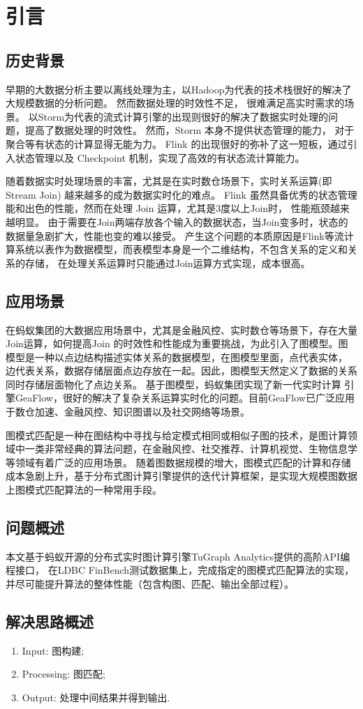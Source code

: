 \section{引言}

\subsection{历史背景}
早期的大数据分析主要以离线处理为主，以Hadoop为代表的技术栈很好的解决了大规模数据的分析问题。
然而数据处理的时效性不足， 很难满足高实时需求的场景。
以Storm为代表的流式计算引擎的出现则很好的解决了数据实时处理的问题，提高了数据处理的时效性。
然而，Storm 本身不提供状态管理的能力， 对于聚合等有状态的计算显得无能为力。
Flink 的出现很好的弥补了这一短板，通过引入状态管理以及 Checkpoint 机制，实现了高效的有状态流计算能力。

随着数据实时处理场景的丰富，尤其是在实时数仓场景下，实时关系运算(即 Stream Join) 越来越多的成为数据实时化的难点。
Flink 虽然具备优秀的状态管理能和出色的性能，然而在处理 Join 运算，尤其是3度以上Join时， 性能瓶颈越来越明显。
由于需要在Join两端存放各个输入的数据状态，当Join变多时，状态的数据量急剧扩大，性能也变的难以接受。
产生这个问题的本质原因是Flink等流计算系统以表作为数据模型，而表模型本身是一个二维结构，不包含关系的定义和关系的存储， 在处理关系运算时只能通过Join运算方式实现，成本很高。

\subsection{应用场景}
在蚂蚁集团的大数据应用场景中，尤其是金融风控、实时数仓等场景下，存在大量Join运算，如何提高Join
的时效性和性能成为重要挑战，为此引入了图模型。图模型是一种以点边结构描述实体关系的数据模型，在图模型里面，点代表实体，
边代表关系，数据存储层面点边存放在一起。因此，图模型天然定义了数据的关系同时存储层面物化了点边关系。
基于图模型，蚂蚁集团实现了新一代实时计算 引擎GeaFlow，很好的解决了复杂关系运算实时化的问题。目前GeaFlow已广泛应用于数仓加速、金融风控、知识图谱以及社交网络等场景。

图模式匹配是一种在图结构中寻找与给定模式相同或相似子图的技术，是图计算领域中一类非常经典的算法问题，在金融风控、社交推荐、计算机视觉、生物信息学等领域有着广泛的应用场景。
随着图数据规模的增大，图模式匹配的计算和存储成本急剧上升，基于分布式图计算引擎提供的迭代计算框架，是实现大规模图数据上图模式匹配算法的一种常用手段。

\subsection{问题概述}
本文基于蚂蚁开源的分布式实时图计算引擎TuGraph Analytics提供的⾼阶API编程接口，
在LDBC FinBench测试数据集上，完成指定的图模式匹配算法的实现，并尽可能提升算法的整体性能（包含构图、匹配、输出全部过程）。

\subsection{解决思路概述}
\begin{enumerate}
  \item Input: 图构建;
  \item Processing: 图匹配;
  \item Output: 处理中间结果并得到输出.
\end{enumerate}
